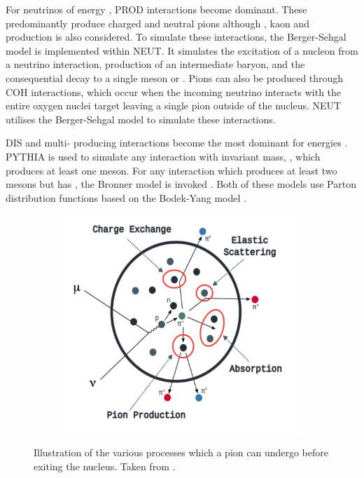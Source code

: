 For neutrinos of energy , PROD interactions become dominant. These predominantly produce charged and neutral pions although \quickmath{\gamma}, kaon and \quickmath{\eta} production is also considered. To simulate these interactions, the Berger-Sehgal \cite{PhysRevD.76.113004} model is implemented within NEUT. It simulates the excitation of a nucleon from a neutrino interaction, production of an intermediate baryon, and the consequential decay to a single meson or \quickmath{\gamma}. Pions can also be produced through COH interactions, which occur when the incoming neutrino interacts with the entire oxygen nuclei target leaving a single pion outside of the nucleus. NEUT utilises the Berger-Sehgal \cite{Berger_Sehgal_coh} model to simulate these interactions.

DIS and multi-\quickmath{\pi} producing interactions become the most dominant for energies . PYTHIA \cite{Sjstrand1994} is used to simulate any interaction with invariant mass, , which produces at least one meson. For any interaction which produces at least two mesons but has , the Bronner model is invoked \cite{Bronner2016}. Both of these models use Parton distribution functions based on the Bodek-Yang model \cite{Gl_ck_1998,10.48550/arxiv.1011.6592,10.48550/arxiv.1012.0261}. 

\begin{figure}[h]
  \begin{subfigure}[t]{0.8\textwidth}
    \includegraphics[width=\textwidth, trim={0mm 0mm 0mm 0mm}, clip,page=1]{Figures/Selections/FSIDiagram.pdf}
  \end{subfigure}
  \caption{Illustration of the various processes which a pion can undergo before exiting the nucleus. Taken from \cite{10.48550/arxiv.1602.05299}.}
  \label{fig:Selection_FSIDiagram}
\end{figure}


